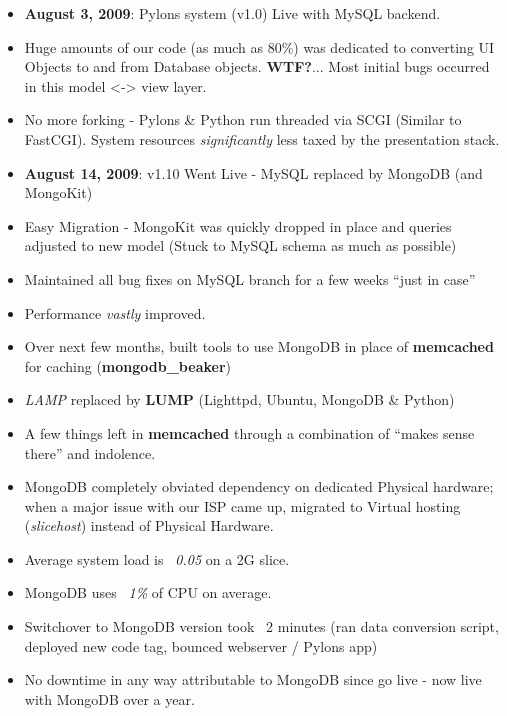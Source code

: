 \documentclass{beamer}
\newenvironment{itemizeframe}
               {\begin{frame}\startitemizeframe} 
               {\stopitemizeframe\end{frame}}
\newcommand\startitemizeframe{\begin{itemize}} \newcommand\stopitemizeframe{\end{itemize}}
\begin{document}
\begin{itemizeframe}
    \frametitle{Sluggy.com Technology History}
    \framesubtitle{Aug. 2009}
	\item {\bf August 3, 2009}: Pylons system (v1.0) Live with MySQL backend.
	\item Huge amounts of our code (as much as 80\%) was dedicated to converting UI Objects to and from Database objects. {\bf WTF?}... Most initial bugs occurred in this model <-> view layer.
	\item No more forking - Pylons \& Python run threaded via SCGI (Similar to FastCGI). System resources {\em significantly} less taxed by the presentation stack.
\end{itemizeframe}

\begin{itemizeframe}
    \frametitle{Sluggy.com Technology History}
    \framesubtitle{Aug. 2009}
	\item {\bf August 14, 2009}: v1.10 Went Live - MySQL replaced by MongoDB (and MongoKit)
	\item Easy Migration - MongoKit was quickly dropped in place and queries adjusted to new model (Stuck to MySQL schema as much as possible)
	\item Maintained all bug fixes on MySQL branch for a few weeks ``just in case''
	\item Performance {\em vastly} improved.
	\item Over next few months, built tools to use MongoDB in place of {\bf memcached} for caching ({\bf mongodb\_beaker})
	\item {\em LAMP} replaced by {\bf LUMP} (Lighttpd, Ubuntu, MongoDB \& Python)
	\item A few things left in {\bf memcached} through a combination of ``makes sense there'' and indolence.
\end{itemizeframe}

\begin{itemizeframe}
    \frametitle{Sluggy.com Technology History}
    \framesubtitle{Sept. 2009}
	\item MongoDB completely obviated dependency on dedicated Physical hardware; when a major issue with our ISP came up, migrated to Virtual hosting ({\em slicehost}) instead of Physical Hardware.
	\item Average system load is {\em ~0.05} on a 2G slice.
	\item MongoDB uses {\em ~1\%} of CPU on average.
	\item Switchover to MongoDB version took ~2 minutes (ran data conversion script, deployed new code tag, bounced webserver / Pylons app)
	\item No downtime in any way attributable to MongoDB since go live - now live with MongoDB over a year.
\end{itemizeframe}
\end{document}
